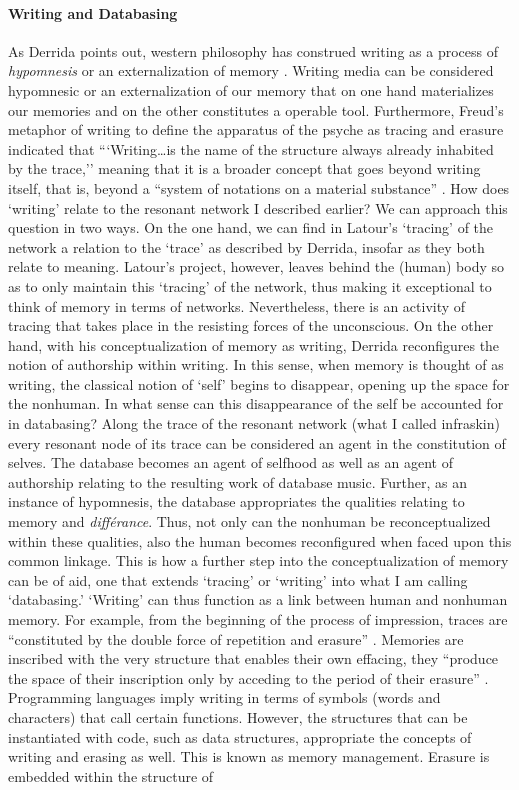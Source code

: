 \paragraph{Writing and Databasing}
As Derrida points out, western philosophy has construed writing as a process of \textit{hypomnesis} or an externalization of memory \parencite[221]{Der78:Wri}. Writing media can be considered hypomnesic or an externalization of our memory that on one hand materializes our memories and on the other constitutes a operable tool. Furthermore, Freud's metaphor of writing to define the apparatus of the psyche as tracing and erasure indicated that ```Writing\dots is the name of the structure always already inhabited by the trace,'' meaning that it is a broader concept that goes beyond writing itself, that is, beyond a ``system of notations on a material sub­stance'' \parencite[xxxix]{Der76:Of}. How does `writing' relate to the resonant network I described earlier? We can approach this question in two ways. On the one hand, we can find in Latour's `tracing' of the network a relation to the `trace' as described by Derrida, insofar as they both relate to meaning. Latour's project, however, leaves behind the (human) body so as to only maintain this `tracing' of the network, thus making it exceptional to think of memory in terms of networks. Nevertheless, there is an activity of tracing that takes place in the resisting forces of the unconscious. On the other hand, with his conceptualization of memory as writing, Derrida reconfigures the notion of authorship within writing. In this sense, when memory is thought of as writing, the classical notion of `self' begins to disappear, opening up the space for the nonhuman. In what sense can this disappearance of the self be accounted for in databasing? Along the trace of the resonant network (what I called infraskin) every resonant node of its trace can be considered an agent in the constitution of selves. The database becomes an agent of selfhood as well as an agent of authorship relating to the resulting work of database music. Further, as an instance of hypomnesis, the database appropriates the qualities relating to memory and \textit{différance}. Thus, not only can the nonhuman be reconceptualized within these qualities, also the human becomes reconfigured when faced upon this common linkage. This is how a further step into the conceptualization of memory can be of aid, one that extends `tracing' or `writing' into what I am calling `databasing.' `Writing' can thus function as a link between human and nonhuman memory. For example, from the beginning of the process of impression, traces are ``constituted by the double force of repetition and erasure'' \parencite[226]{Der78:Wri}. Memories are inscribed with the very structure that enables their own effacing, they ``produce the space of their inscription only by acceding to the period of their erasure'' \parencite[226]{Der78:Wri}. Programming languages imply writing in terms of symbols (words and characters) that call certain functions. However, the structures that can be instantiated with code, such as data structures, appropriate the concepts of writing and erasing as well. This is known as memory management. Erasure is embedded within the structure of 